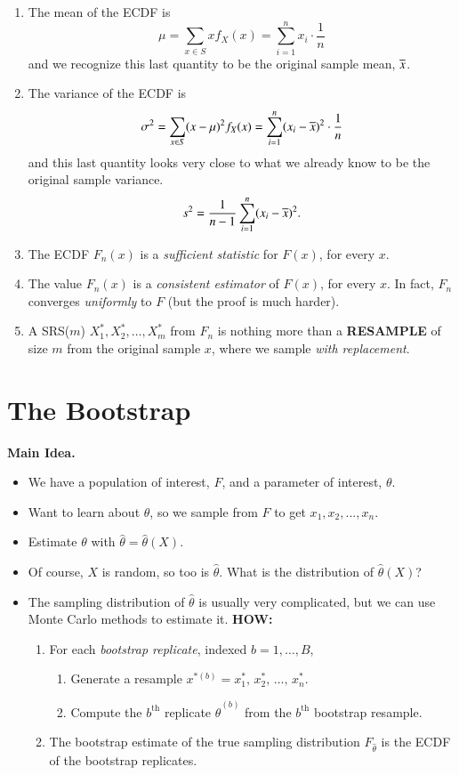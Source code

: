 \documentclass[captions=tableheading]{scrbook}
\begin{document}
\begin{enumerate}
\item The mean of the ECDF is
   \[
   \mu=\sum_{x\in S}xf_{X}(x)=\sum_{i=1}^{n}x_{i}\cdot\frac{1}{n}
   \]
   and we recognize this last quantity to be the original sample mean, \(\overline{x}\).
\item The variance of the ECDF is
   \[
   \sigma^{2}=\sum_{x\in S}(x-\mu)^{2}f_{X}(x)=\sum_{i=1}^{n}(x_{i}-\overline{x})^{2}\cdot\frac{1}{n}
   \]
   and this last quantity looks very close to what we already know to be the original sample variance.
   \[
   s^{2}=\frac{1}{n-1}\sum_{i=1}^{n}(x_{i}-\overline{x})^{2}.
   \]
\item The ECDF $F_{n}(x)$ is a \emph{sufficient statistic} for $F(x)$, for every $x$.
\item The value $F_{n}(x)$ is a \emph{consistent estimator} of $F(x)$, for every $x$.  In fact, $F_{n}$ converges \emph{uniformly} to $F$ (but the proof is much harder).
\item A SRS($m$) \(X_{1}^{\ast},X_{2}^{\ast},\ldots,X_{m}^{\ast}\) from $F_{n}$ is nothing more than a \textbf{RESAMPLE} of size $m$ from the original sample $x$, where we sample \emph{with replacement}.
\end{enumerate}
\section{The Bootstrap}
\label{sec-4_2}



\textbf{Main Idea.}

\begin{itemize}
\item We have a population of interest, $F$, and a parameter of interest, $\theta$.
\item Want to learn about $\theta$, so we sample from $F$ to get \(x_{1}, x_{2}, ..., x_{n}\).
\item Estimate $\theta$ with $\hat{\theta} = \hat{\theta}(X)$.
\item Of course, $X$ is random, so too is $\hat{\theta}$.  What is the distribution of $\hat{\theta}(X)$?
\item The sampling distribution of $\hat{\theta}$ is usually very complicated, but we can use Monte Carlo methods to estimate it.  \textbf{HOW:}
\begin{enumerate}
\item For each \emph{bootstrap replicate}, indexed \(b = 1,\ldots ,B\),
\begin{enumerate}
\item Generate a resample $x^{\ast(b)}= x_{1}^{\ast},\,x_{2}^{\ast},\,\ldots,\,x_{n}^{\ast}$.
\item Compute the $b^{\mathrm{th}}$ replicate $\hat{\theta}^{(b)}$ from the $b^{\mathrm{th}}$ bootstrap resample.
\end{enumerate}
\item The bootstrap estimate of the true sampling distribution $F_{\hat{\theta}}$ is the ECDF of the bootstrap replicates.
\end{enumerate}
\end{itemize}
\end{document}
